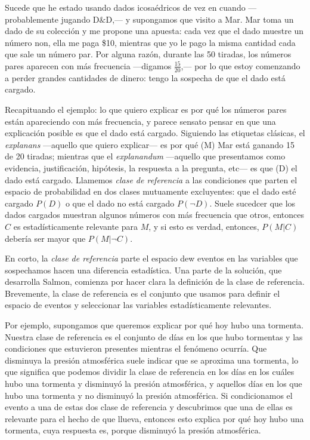 Sucede que he estado usando dados icosaédricos de vez en cuando
---probablemente jugando D$\&$D,--- y supongamos que visito a
Mar. Mar toma un dado de su colección y me propone una apuesta: cada
vez que el dado muestre un número non, ella me paga \$10, mientras
que yo le pago la misma cantidad cada que sale un número par. Por
alguna razón, durante las 50 tiradas, los números pares aparecen con
más frecuencia ---digamos $ \frac{ 15 }{ 20 } $,--- por lo que estoy
comenzando a perder grandes cantidades de dinero: tengo la sospecha
de que el dado está cargado.

Recapituando el ejemplo: lo que quiero explicar es por qué los
números pares están apareciendo con más frecuencia, y parece sensato
pensar en que una explicación posible es que el dado está cargado.
Siguiendo las etiquetas clásicas, el \emph{explanans} ---aquello que
quiero explicar--- es por qué (M) Mar está ganando 15 de 20 tiradas;
mientras que el \emph {explanandum} ---aquello que presentamos como
evidencia, justificación, hipótesis, la respuesta a la pregunta,
etc--- es que (D) el dado está cargado. Llamemos \emph{clase de
	referencia} a las condiciones que parten el espacio de probabilidad
en dos clases mutuamente excluyentes: que el dado esté cargado $ P( D ) $
o que el dado no está cargado $ P( \neg D ) $. Suele sucedcer que los
dados cargados muestran algunos números con más frecuencia que otros,
entonces $ C $ es estadísticamente relevante para $ M $, y si esto es
verdad, entonces, $ P( M | C ) $ debería ser mayor que $  P( M | \neg C )
$.

En corto, la \emph{clase de referencia} parte el espacio dew eventos
en las variables que sospechamos hacen una diferencia estadística.
Una parte de la solución, que desarrolla Salmon, comienza por hacer
clara la definición de la clase de referencia. Brevemente, la clase
de referencia es el conjunto que usamos para definir el espacio de
eventos y seleccionar las variables estadísticamente relevantes.

Por ejemplo, supongamos que queremos explicar por qué hoy hubo una
tormenta. Nuestra clase de referencia es el conjunto de días en los que
hubo tormentas y las condiciones que estuvieron presentes mientras el
fenómeno ocurría. Que disminuya la presión atmosférica suele indicar
que se aproxima una tormenta, lo que significa que podemos dividir la
clase de referencia en los días en los cuáles hubo una tormenta y
disminuyó la presión atmosférica, y aquellos días en los que hubo una
tormenta y no disminuyó la presión atmosférica. Si condicionamos el
evento a una de estas dos clase de referencia y descubrimos que una
de ellas es relevante para el hecho de que llueva, entonces esto
explica por qué hoy hubo una tormenta, cuya respuesta es, porque
disminuyó la presión atmosférica.

